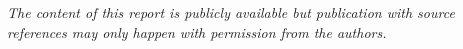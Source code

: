 \begin{nopagebreak}
\begin{multicols}{2}

    \vfill
    \columnbreak


  \end{multicols}
  \vfill
  \centering
  \textit{The content of this report is publicly available but publication with source references may only happen with permission from the authors.}
\end{nopagebreak}
